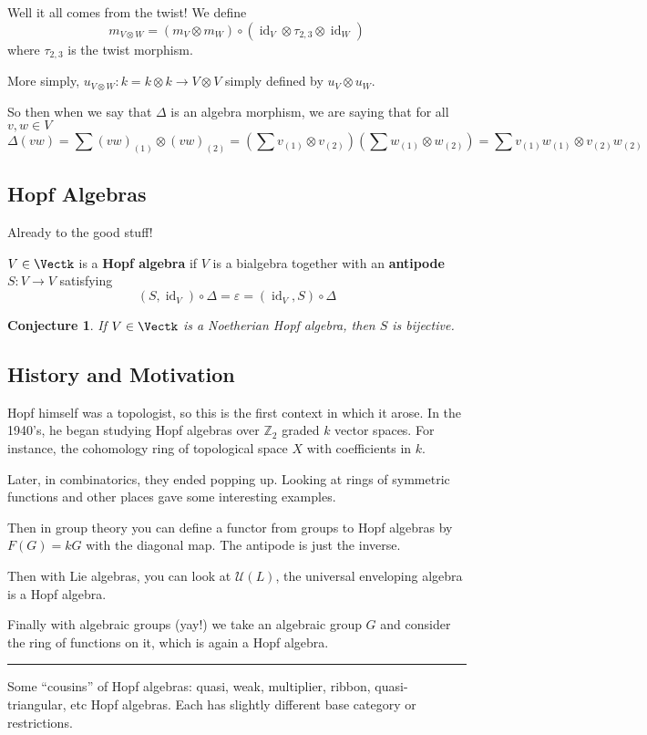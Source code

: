 \documentclass[12pt]{article}
\theoremstyle{break}
\theoremstyle{nonumberbreak}
\theoremstyle{changebreak}
\theoremstyle{break}
\theoremstyle{nonumberbreak}
\theoremstyle{nonumberplain}
\newtheorem{conj}{Conjecture}
\theoremstyle{change}
\newcommand*{\Z}{
\mathbb{Z}
}
\newcommand*{\brk}{
\rule{2in}{.1pt}
}
\DeclareMathOperator{\id}{id}
\begin{document}
Well it all comes from the twist! We define
\[m_{V\otimes W}=(m_V\otimes m_W)\circ(\id_V\otimes \tau_{2,3}\otimes \id_W)\]
where $\tau_{2,3}$ is the twist morphism.

More simply, $u_{V\otimes W}:k=k\otimes k\to V\otimes V$ simply defined by $u_V\otimes u_W$.

So then when we say that $\Delta$ is an algebra morphism, we are saying that for all $v,w\in V$
\[\Delta(vw)=\sum(vw)_{(1)}\otimes(vw)_{(2)}=(\sum v_{(1)}\otimes v_{(2)})(\sum w_{(1)}\otimes w_{(2)})=\sum v_{(1)}w_{(1)}\otimes v_{(2)}w_{(2)}\]

\subsection{Hopf Algebras}
Already to the good stuff!
\begin{defn}
	$V\in\Vectk$ is a \textbf{Hopf algebra} if $V$ is a bialgebra together with an \textbf{antipode}
	$S:V\to V$ satisfying
	\[(S,\id_V)\circ \Delta=\varepsilon=(\id_V,S)\circ\Delta\]
\end{defn}
\begin{conj}
	If $V\in\Vectk$ is a Noetherian Hopf algebra, then $S$ is bijective.
\end{conj}

\subsection{History and Motivation}
Hopf himself was a topologist, so this is the first context in which it arose. In the 1940's,
he began studying Hopf algebras over $\Z_2$ graded $k$ vector spaces. For instance, the 
cohomology ring of topological space $X$ with coefficients in $k$.

Later, in combinatorics, they ended popping up. Looking at rings of symmetric functions and other places
gave some interesting examples.

Then in group theory you can define a functor from groups to Hopf algebras by $F(G)=kG$
with the diagonal map. The antipode is just the inverse.

Then with Lie algebras, you can look at $\mathcal{U}(L)$, the universal enveloping algebra is a Hopf algebra.

Finally with algebraic groups (yay!) we take an algebraic group $G$ and consider the ring of functions on it, 
which is again a Hopf algebra.

\brk

Some ``cousins'' of Hopf algebras: quasi, weak, multiplier, ribbon, quasi-triangular, etc Hopf algebras. 
Each has slightly different base category or restrictions.
\end{document}
